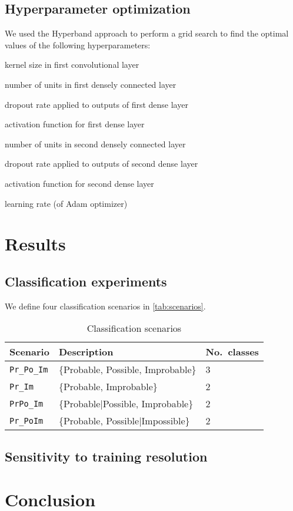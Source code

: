\documentclass[11pt,twoside]{article}
\numberwithin{equation}{section}
\newcommand{\?}{\stackrel{?}{=}}
\begin{document}
\subsection{Hyperparameter optimization}
We used the Hyperband approach \cite{li2018hyperband} to perform a grid search to find the optimal values of the following hyperparameters:
\begin{compactitem}
    \item kernel size in first convolutional layer
    \item number of units in first densely connected layer
    \item dropout rate applied to outputs of first dense layer
    \item activation function for first dense layer
    \item number of units in second densely connected layer
    \item dropout rate applied to outputs of second dense layer
    \item activation function for second dense layer    
    \item learning rate (of Adam optimizer)
\end{compactitem}

\section{Results}

\subsection{Classification experiments}

We define four classification scenarios in \autoref{tab:scenarios}. 

\begin{table}[h!]
    \centering
    \begin{tabular}{l l l}\toprule
    \bf Scenario            & \bf Description  & \bf No.\ classes\\\midrule
    \texttt{Pr\_Po\_Im}     &  \{Probable, Possible, Improbable\} & 3 \\
    \texttt{Pr\_Im}          & \{Probable, Improbable\}           & 2 \\
    \texttt{PrPo\_Im}        & \{Probable|Possible, Improbable\}  & 2 \\
    \texttt{Pr\_PoIm}        & \{Probable, Possible|Impossible\}  & 2 \\\bottomrule
    \end{tabular}
    \caption{Classification scenarios}
    \label{tab:scenarios}
\end{table}

\subsection{Sensitivity to training resolution}

\section{Conclusion}

\printbibliography

\appendix
\end{document}
